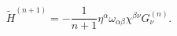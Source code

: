 \begin{equation}
 \tilde{H}^{(n+1)}=-
 \frac{1}{n+1}\eta^\alpha\omega_{\alpha\beta}\chi^{\beta\nu}G^{(n)}_\nu.
 \label{a22}
 \end{equation}

